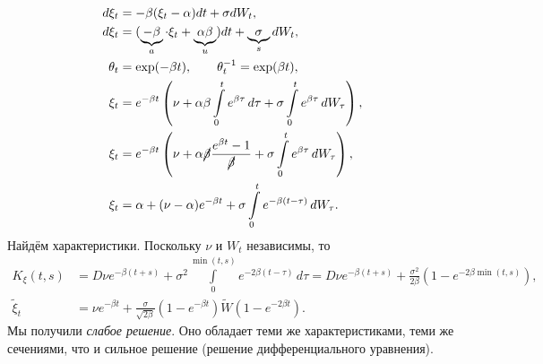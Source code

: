  \begin{example}
   
  \begin{align*}
    d\xi_t &= -\beta(\xi_t - \alpha) dt + \sigma dW_t, \\
    d\xi_t &= (\underbrace{-\beta}_{a} \cdot \xi_t + \underbrace{\alpha\beta}_{u})
    dt + \underbrace{\sigma}_{s} dW_t, \\
  \theta_t &= \exp(-\beta t), \qquad \theta^{-1}_t = \exp(\beta t), \\
  \xi_t &= e^{-\beta t} \left( \nu + \alpha\beta \int\limits_{0}^{t} e^{\beta
  \tau}\,d\tau + \sigma \int\limits_{0}^{t}e^{\beta \tau}\,dW_\tau \right), \\
      \xi_t &= e^{-\beta t} \left( \nu + \alpha \cancel{\beta} \frac{e^{\beta t}
      - 1}{\cancel{\beta}} + \sigma \int\limits_{0}^{t}e^{\beta \tau}\,dW_\tau
    \right), \\
          \xi_t &= \alpha + (\nu -\alpha)e^{-\beta t} + \sigma \int\limits_{0}^{t}
    e^{-\beta(t - \tau)}\,dW_\tau.
  \end{align*}
 Найдём характеристики. Поскольку $ \nu $ и $ W_t $ независимы, то  
 \begin{align*}
   K_\xi(t, s) &= D\nu e^{-\beta(t+s)} + \sigma^2 \int\limits_{0}^{\min(t, s)}
   e^{-2\beta(t-\tau)}\,d\tau = D\nu e^{-\beta(t+s)} + \frac{\sigma^2}{2\beta} \left(1
   - e^{-2\beta\min(t, s)}\right), \\
   \tilde{\xi}_t &= \nu e^{-\beta t} + \frac{\sigma}{\sqrt{2\beta}} \left( 1 -
   e^{-\beta t} \right) \widetilde{W}(1 - e^{-2\beta t}).
 \end{align*}
 Мы получили \emph{слабое решение}. Оно обладает теми же характеристиками, теми
 же сечениями, что и сильное решение (решение дифференциального уравнения). 
 \end{example}



